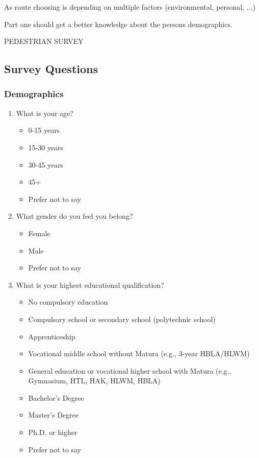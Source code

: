 As route choosing is depending on multiple factors (environmental, personal, ...)


Part one should get a better knowledge about the persons demographics. 


PEDESTRIAN SURVEY

\subsection{Survey Questions}

\subsubsection{Demographics}

\begin{enumerate}
    \item What is your age?
    \begin{itemize}
        \item 0-15 years
        \item 15-30 years
        \item 30-45 years
        \item 45+
        \item Prefer not to say
    \end{itemize}
    
    \item What gender do you feel you belong?
    \begin{itemize}
        \item Female
        \item Male
        \item Prefer not to say
    \end{itemize}
    
    \item What is your highest educational qualification?
    \begin{itemize}
        \item No compulsory education 
        \item Compulsory school or secondary school (polytechnic school)
        \item Apprenticeship 
        \item Vocational middle school without Matura (e.g., 3-year HBLA/HLWM) 
        \item General education or vocational higher school with Matura (e.g., Gymnasium, HTL, HAK, HLWM, HBLA) 
        \item Bachelor's Degree
        \item Master's Degree
        \item Ph.D. or higher
        \item Prefer not to say
    \end{itemize}
    

\end{enumerate}
